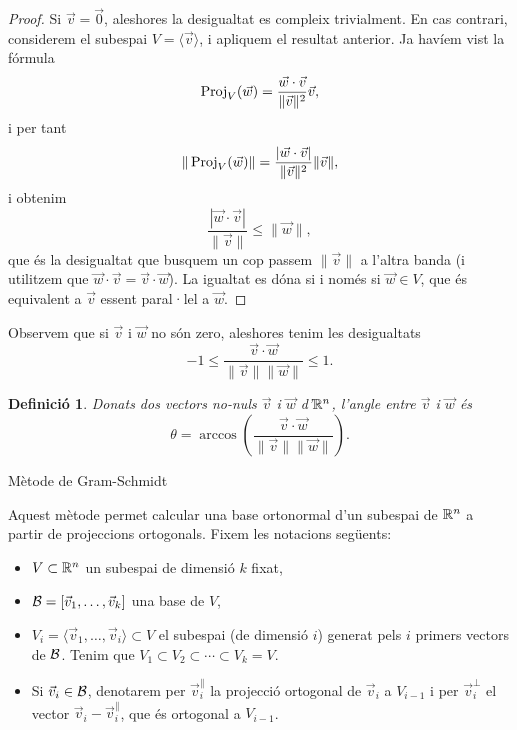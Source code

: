 \documentclass[
  11pt,
]{book}
\makeatletter
\numberwithin{dummy}{section}
\theoremstyle{maincolornumbox}
\theoremstyle{blacknumex}
\theoremstyle{blacknumbox}
\newtheorem{definitionT}{Definició}[chapter]
\theoremstyle{maincolornum}
\newenvironment{definition}{\begin{dBox}\begin{definitionT}}{\end{definitionT}\end{dBox}}
\renewcommand{\section}{\@startsection{section}{1}{\z@}
{-4ex \@plus -1ex \@minus -.4ex}
{1ex \@plus.2ex }
{\normalfont\large\sffamily\bfseries}}
\newlength\esp
\makeatother
\begin{document}
\begin{proof}
Si \(\vec v=\vec 0\), aleshores la desigualtat es compleix
trivialment. En cas contrari, considerem el subespai
\(V=\langle \vec v\rangle\), i apliquem el resultat anterior. Ja havíem
vist la fórmula
\[\operatorname{Proj}_V(\vec w) = \frac{\vec w\cdot \vec v}{\|\vec v\|^2} \vec v,\] i
per tant
\[\|\operatorname{Proj}_V(\vec w)\| = \frac{|\vec w\cdot \vec v|}{\|\vec v\|^2} \|\vec v\|,\]
i obtenim \[\frac{|\vec w\cdot \vec v|}{\|\vec v\|} \leq \|\vec w\|,\]
que és la desigualtat que busquem un cop passem \(\|\vec v\|\) a l'altra
banda (i utilitzem que \(\vec w\cdot \vec v=\vec v\cdot \vec w\)). La
igualtat es dóna si i només si \(\vec w\in V\), que és equivalent a
\(\vec v\) essent paral·lel a \(\vec w\).
\end{proof}

Observem que si \(\vec v\) i \(\vec w\) no són zero, aleshores tenim les
desigualtats
\[-1 \leq \frac{\vec v\cdot \vec w}{\|\vec v\|\|\vec w\|}\leq 1.\]

\begin{definition}
Donats dos vectors no-nuls \(\vec v\) i \(\vec w\) d'\(\mathbb{R}^n\), \emph{l'angle entre
\(\vec v\) i \(\vec w\)} és
\[\theta = \arccos\left(\frac{\vec v\cdot \vec w}{\|\vec v\|\|\vec w\|}\right).\]
\end{definition}

\hypertarget{muxe8tode-de-gram-schmidt}{%
\section{Mètode de Gram-Schmidt}\label{muxe8tode-de-gram-schmidt}}

Aquest mètode permet calcular una base ortonormal d'un subespai de
\(\mathbb{R}^n\) a partir de projeccions ortogonals. Fixem les notacions següents:

\begin{itemize}
\item
  \(V\subset \mathbb{R}^n\) un subespai de dimensió \(k\) fixat,
\item
  \(\mathcal{B} =[\vec v_1, \dots , \vec v_k]\) una base de \(V\),
\item
  \(V_i=\langle \vec v_1, \dots , \vec v_i\rangle \subset V\) el
  subespai (de dimensió \(i\)) generat pels \(i\) primers vectors de
  \(\mathcal{B}\). Tenim que \(V_1\subset V_2\subset \cdots \subset V_k=V\).
\item
  Si \(\vec v_i\in\mathcal{B}\), denotarem per \(\vec v_i^\parallel\) la
  projecció ortogonal de \(\vec v_i\) a \(V_{i-1}\) i per \(\vec v_i^\perp\)
  el vector \(\vec v_i - \vec v_i^\parallel\), que és ortogonal a
  \(V_{i-1}\).
\end{itemize}
\end{document}
